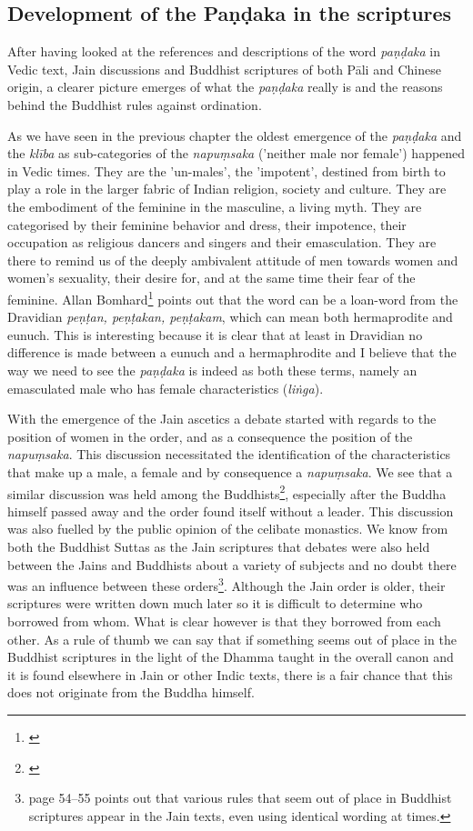\subsection{Development of the Paṇḍaka in the scriptures}
After having looked at the references and descriptions of the word {\em paṇḍaka} in Vedic text, Jain discussions and Buddhist scriptures of both Pāli and Chinese origin, a clearer picture emerges of what the {\em paṇḍaka} really is and the reasons behind the Buddhist rules against ordination.

As we have seen in the previous chapter the oldest emergence of the {\em paṇḍaka} and the {\em klība} as sub-categories of the {\em napuṃsaka} ('neither male nor female') happened in Vedic times. They are the 'un-males', the 'impotent', destined from birth to play a role in the larger fabric of Indian religion, society and culture. They are the embodiment of the feminine in the masculine, a living myth. They are categorised by their feminine behavior and dress, their impotence, their occupation as religious dancers and singers and their emasculation. They are there to remind us of the deeply ambivalent attitude of men towards women and women's sexuality, their desire for, and at the same time their fear of the feminine. Allan Bomhard\footnote{\cite{bomhard}} points out that the word can be a loan-word from the Dravidian {\em peṇṭan, peṇṭakan, peṇṭakam}, which can mean both hermaprodite and eunuch. This is interesting because it is clear that at least in Dravidian no difference is made between a eunuch and a hermaphrodite and I believe that the way we need to see the {\em paṇḍaka} is indeed as both these terms, namely an emasculated male who has female characteristics ({\em liṅga}).

With the emergence of the Jain ascetics a debate started with regards to the position of women in the order, and as a consequence the position of the {\em napuṃsaka}. This discussion necessitated the identification of the characteristics that make up a male, a female and by consequence a {\em napuṃsaka}. We see that a similar discussion was held among the Buddhists\footnote{\cite{sujato2009}}, especially after the Buddha himself passed away and the order found itself without a leader. This discussion was also fuelled by the public opinion of the celibate monastics. We know from both the Buddhist Suttas as the Jain scriptures that debates were also held between the Jains and Buddhists about a variety of subjects and no doubt there was an influence between these orders\footnote{\cite{sujato2009} page 54–55 points out that various rules that seem out of place in Buddhist scriptures appear in the Jain texts, even using identical wording at times.}. Although the Jain order is older, their scriptures were written down much later so it is difficult to determine who borrowed from whom. What is clear however is that they borrowed from each other. As a rule of thumb we can say that if something seems out of place in the Buddhist scriptures in the light of the Dhamma taught in the overall canon and it is found elsewhere in Jain or other Indic texts, there is a fair chance that this does not originate from the Buddha himself.


